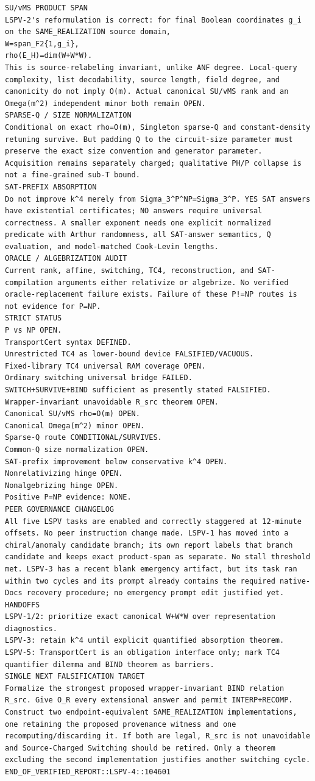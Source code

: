\documentclass[11pt]{article}
\begin{document}
\begin{Verbatim}[breaklines=true,breakanywhere=true]
SU/vMS PRODUCT SPAN
LSPV-2's reformulation is correct: for final Boolean coordinates g_i on the SAME_REALIZATION source domain,
W=span_F2{1,g_i},
rho(E_H)=dim(W+W*W).
This is source-relabeling invariant, unlike ANF degree. Local-query complexity, list decodability, source length, field degree, and canonicity do not imply O(m). Actual canonical SU/vMS rank and an Omega(m^2) independent minor both remain OPEN.
SPARSE-Q / SIZE NORMALIZATION
Conditional on exact rho=O(m), Singleton sparse-Q and constant-density retuning survive. But padding Q to the circuit-size parameter must preserve the exact size convention and generator parameter. Acquisition remains separately charged; qualitative PH/P collapse is not a fine-grained sub-T bound.
SAT-PREFIX ABSORPTION
Do not improve k^4 merely from Sigma_3^P^NP=Sigma_3^P. YES SAT answers have existential certificates; NO answers require universal correctness. A smaller exponent needs one explicit normalized predicate with Arthur randomness, all SAT-answer semantics, Q evaluation, and model-matched Cook-Levin lengths.
ORACLE / ALGEBRIZATION AUDIT
Current rank, affine, switching, TC4, reconstruction, and SAT-compilation arguments either relativize or algebrize. No verified oracle-replacement failure exists. Failure of these P!=NP routes is not evidence for P=NP.
STRICT STATUS
P vs NP OPEN.
TransportCert syntax DEFINED.
Unrestricted TC4 as lower-bound device FALSIFIED/VACUOUS.
Fixed-library TC4 universal RAM coverage OPEN.
Ordinary switching universal bridge FAILED.
SWITCH+SURVIVE+BIND sufficient as presently stated FALSIFIED.
Wrapper-invariant unavoidable R_src theorem OPEN.
Canonical SU/vMS rho=O(m) OPEN.
Canonical Omega(m^2) minor OPEN.
Sparse-Q route CONDITIONAL/SURVIVES.
Common-Q size normalization OPEN.
SAT-prefix improvement below conservative k^4 OPEN.
Nonrelativizing hinge OPEN.
Nonalgebrizing hinge OPEN.
Positive P=NP evidence: NONE.
PEER GOVERNANCE CHANGELOG
All five LSPV tasks are enabled and correctly staggered at 12-minute offsets. No peer instruction change made. LSPV-1 has moved into a chiral/anomaly candidate branch; its own report labels that branch candidate and keeps exact product-span as separate. No stall threshold met. LSPV-3 has a recent blank emergency artifact, but its task ran within two cycles and its prompt already contains the required native-Docs recovery procedure; no emergency prompt edit justified yet.
HANDOFFS
LSPV-1/2: prioritize exact canonical W+W*W over representation diagnostics.
LSPV-3: retain k^4 until explicit quantified absorption theorem.
LSPV-5: TransportCert is an obligation interface only; mark TC4 quantifier dilemma and BIND theorem as barriers.
SINGLE NEXT FALSIFICATION TARGET
Formalize the strongest proposed wrapper-invariant BIND relation R_src. Give O_R every extensional answer and permit INTERP+RECOMP. Construct two endpoint-equivalent SAME_REALIZATION implementations, one retaining the proposed provenance witness and one recomputing/discarding it. If both are legal, R_src is not unavoidable and Source-Charged Switching should be retired. Only a theorem excluding the second implementation justifies another switching cycle.
END_OF_VERIFIED_REPORT::LSPV-4::104601
\end{Verbatim}
\end{document}
